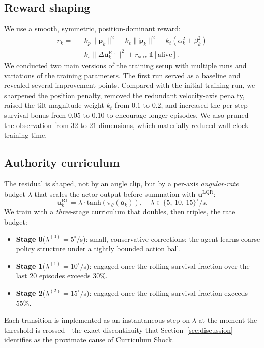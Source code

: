 \documentclass[conference]{IEEEtran}
\begin{document}
\subsection{Reward shaping}
We use a smooth, symmetric, position-dominant reward:
\begin{align}
r_k = &-k_p \|\bm{p}_k\|^2 - k_v \|\dot{\bm{p}}_k\|^2 - k_t (\alpha_k^2+\beta_k^2)\nonumber\\
      &-k_s \|\Delta\bm{u}^{\text{RL}}_k\|^2 + r_{\text{surv}}\,\mathbb{1}[\text{alive}].
\label{eq:reward}
\end{align}
We conducted two main versions of the training setup with multiple runs and variations of the training parameters. The first run served as a baseline and revealed several improvement points. Compared with the initial training run, we sharpened the position penalty,
removed the redundant velocity-axis penalty, raised the tilt-magnitude weight
$k_t$ from $0.1$ to $0.2$, and increased the per-step survival bonus from
$0.05$ to $0.10$ to encourage longer episodes. We also pruned the observation
from $32$ to $21$ dimensions, which materially reduced wall-clock training
time.

\subsection{Authority curriculum}
\label{sec:curr}
The residual is shaped, not by an angle clip, but by a per-axis
\emph{angular-rate} budget $\lambda$ that scales the actor output before
summation with $\bm{u}^{\text{LQR}}$:
\begin{equation}
\bm{u}^{\text{RL}}_k = \lambda \cdot \mathrm{tanh}(\pi_\theta(\bm{o}_k)),\quad
\lambda \in \{5,\,10,\,15\}^\circ /\text{s}.
\label{eq:lambda}
\end{equation}
We train with a \emph{three}-stage curriculum that doubles, then triples,
the rate budget:
\begin{itemize}
  \item \textbf{Stage 0}\;\;($\lambda^{(0)} = 5^\circ/$s):
        small, conservative corrections; the agent learns coarse policy
        structure under a tightly bounded action ball.
  \item \textbf{Stage 1}\;\;($\lambda^{(1)} = 10^\circ/$s):
        engaged once the rolling survival fraction over the last $20$
        episodes exceeds $30\%$.
  \item \textbf{Stage 2}\;\;($\lambda^{(2)} = 15^\circ/$s):
        engaged once the rolling survival fraction exceeds $55\%$.
\end{itemize}
Each transition is implemented as an instantaneous step on $\lambda$ at
the moment the threshold is crossed---the exact discontinuity that
Section~\ref{sec:discussion} identifies as the proximate cause of
Curriculum Shock.
\end{document}
